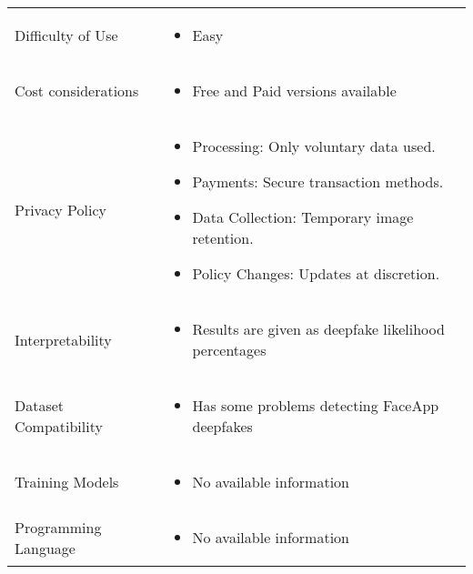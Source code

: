 \begin{table}[htpb]
\begin{tabularx}{\textwidth}{l X}
		\addlinespace
		Difficulty of Use            & \begin{itemize}
			                               \item Easy
		                               \end{itemize}                                             \\
		\addlinespace
		Cost considerations          & \begin{itemize}
			                               \item Free and Paid versions available
		                               \end{itemize}                      \\
		\addlinespace
		Privacy Policy               & \begin{itemize}
			                               \item Processing: Only voluntary data used.
			                               \item Payments: Secure transaction methods.
			                               \item Data Collection: Temporary image retention.
			                               \item Policy Changes: Updates at discretion.
		                               \end{itemize}           \\
		\addlinespace
		Interpretability             & \begin{itemize}
			                               \item Results are given as deepfake likelihood percentages
		                               \end{itemize}  \\
		\addlinespace
		Dataset Compatibility        & \begin{itemize}
			                               \item Has some problems detecting FaceApp deepfakes
		                               \end{itemize}         \\
		\addlinespace
		Training Models              & \begin{itemize}
			                               \item No available information
		                               \end{itemize}                              \\
		\addlinespace
		Programming Language         & \begin{itemize}
			                               \item No available information
		                               \end{itemize}                              \\
		\bottomrule
	\end{tabularx}
\end{table}

